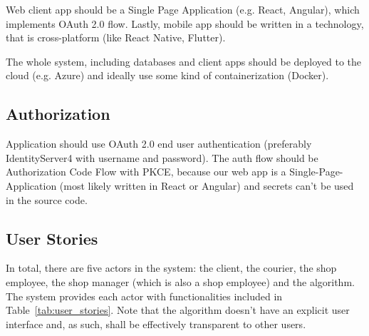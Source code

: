 \documentclass[../main.tex]{subfiles}
\begin{document}
Web client app should be a Single Page Application (e.g. React, Angular), which implements OAuth 2.0 flow. Lastly, mobile app should be written in a technology, that is cross-platform (like React Native, Flutter).

The whole system, including databases and client apps should be deployed to the cloud (e.g. Azure) and ideally use some kind of containerization (Docker).

\subsection{Authorization}

Application should use OAuth 2.0 end user authentication (preferably IdentityServer4 with username and password). The auth flow should be Authorization Code Flow with PKCE, because our web app is a Single-Page-Application (most likely written in React or Angular) and secrets can't be used in the source code.

\subsection{User Stories}

In total, there are five actors in the system: the client, the courier, the shop employee, the shop manager (which is also a shop employee) and the algorithm. The system provides each actor with functionalities included in Table~\ref{tab:user_stories}. Note that the algorithm doesn't have an explicit user interface and, as such, shall be effectively transparent to other users. 
\end{document}
